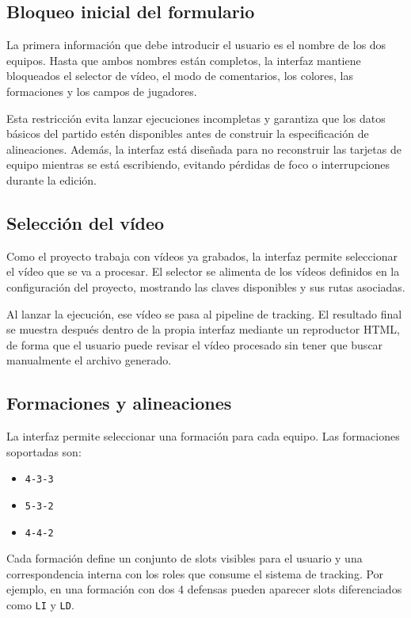 \subsection{Bloqueo inicial del formulario}

La primera información que debe introducir el usuario es el nombre de los dos equipos. Hasta que ambos nombres están completos, la interfaz mantiene bloqueados el selector de vídeo, el modo de comentarios, los colores, las formaciones y los campos de jugadores.

Esta restricción evita lanzar ejecuciones incompletas y garantiza que los datos básicos del partido estén disponibles antes de construir la especificación de alineaciones. Además, la interfaz está diseñada para no reconstruir las tarjetas de equipo mientras se está escribiendo, evitando pérdidas de foco o interrupciones durante la edición.

\subsection{Selección del vídeo}

Como el proyecto trabaja con vídeos ya grabados, la interfaz permite seleccionar el vídeo que se va a procesar. El selector se alimenta de los vídeos definidos en la configuración del proyecto, mostrando las claves disponibles y sus rutas asociadas.

Al lanzar la ejecución, ese vídeo se pasa al pipeline de tracking. El resultado final se muestra después dentro de la propia interfaz mediante un reproductor HTML, de forma que el usuario puede revisar el vídeo procesado sin tener que buscar manualmente el archivo generado.

\subsection{Formaciones y alineaciones}

La interfaz permite seleccionar una formación para cada equipo. Las formaciones soportadas son:

\begin{itemize}
    \item \texttt{4-3-3}
    \item \texttt{5-3-2}
    \item \texttt{4-4-2}
\end{itemize}

Cada formación define un conjunto de slots visibles para el usuario y una correspondencia interna con los roles que consume el sistema de tracking. Por ejemplo, en una formación con dos 4 defensas pueden aparecer slots diferenciados como \texttt{LI} y \texttt{LD}.

